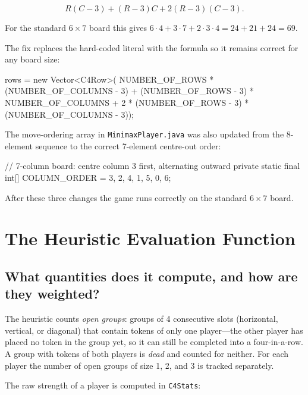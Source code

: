 \documentclass[language=english,titlepage=false,smartquotes=true]{hgbreport}
\begin{document}
\begin{equation}
  R(C-3) + (R-3)C + 2(R-3)(C-3).
  \label{eq:rows}
\end{equation}

For the standard $6 \times 7$ board this gives
$6 \cdot 4 + 3 \cdot 7 + 2 \cdot 3 \cdot 4 = 24 + 21 + 24 = 69$.

The fix replaces the hard-coded literal with the formula so it remains
correct for any board size:

\begin{JavaCode}[numbers=none]
rows = new Vector<C4Row>(
    NUMBER_OF_ROWS * (NUMBER_OF_COLUMNS - 3)
    + (NUMBER_OF_ROWS - 3) * NUMBER_OF_COLUMNS
    + 2 * (NUMBER_OF_ROWS - 3) * (NUMBER_OF_COLUMNS - 3));
\end{JavaCode}

The move-ordering array in \texttt{MinimaxPlayer.java} was also updated from
the 8-element sequence to the correct 7-element centre-out order:

\begin{JavaCode}[numbers=none]
// 7-column board: centre column 3 first, alternating outward
private static final int[] COLUMN_ORDER = {3, 2, 4, 1, 5, 0, 6};
\end{JavaCode}

After these three changes the game runs correctly on the standard
$6 \times 7$ board.

\section{The Heuristic Evaluation Function}

\subsection{What quantities does it compute, and how are they weighted?}

The heuristic counts \emph{open groups}: groups of 4 consecutive slots
(horizontal, vertical, or diagonal) that contain tokens of only one player---the
other player has placed no token in the group yet, so it can still be
completed into a four-in-a-row. A group with tokens of both players is
\emph{dead} and counted for neither. For each player the number of open groups
of size 1, 2, and 3 is tracked separately.

The raw strength of a player is computed in \texttt{C4Stats}:
\end{document}
